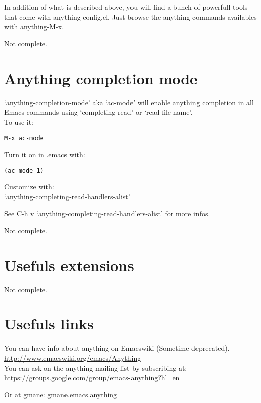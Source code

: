 \documentclass[a4paper,11pt]{article}
\begin{document}
In addition of what is described above, you will find a bunch of powerfull tools that come with anything-config.el.
Just browse the anything commands availables with anything-M-x.

Not complete.

\section{Anything completion mode}
\label{sec:anyth-compl-mode}
`anything-completion-mode' aka `ac-mode' will enable anything completion in all 
Emacs commands using `completing-read' or `read-file-name'.\\
To use it:
\begin{verbatim}
M-x ac-mode
\end{verbatim}
Turn it on in .emacs with:
\begin{verbatim}
(ac-mode 1)
\end{verbatim}
Customize with:\\
`anything-completing-read-handlers-alist'

See C-h v `anything-completing-read-handlers-alist' for more infos.

Not complete.

\section{Usefuls extensions}
\label{sec:usefuls-extensions}
Not complete.

\section{Usefuls links}
\label{sec:usefuls-links}

You can have info about anything on Emacswiki (Sometime deprecated).\\
\url{http://www.emacswiki.org/emacs/Anything}\\

You can ask on the anything mailing-list by subscribing at:\\
\url{https://groups.google.com/group/emacs-anything?hl=en}

Or at gmane: gmane.emacs.anything
\end{document}
